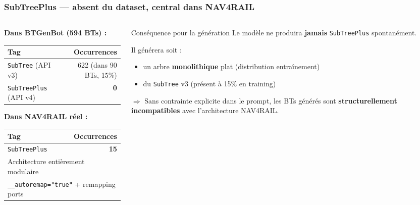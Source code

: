 \documentclass[aspectratio=169]{beamer}
\begin{document}
\begin{frame}
  \frametitle{SubTreePlus --- absent du dataset, central dans NAV4RAIL}

  \begin{columns}[T]
    \begin{column}{0.50\textwidth}
      \textbf{Dans BTGenBot (594 BTs) :}

      \vspace{0.4em}
      {\scriptsize\begin{tabular}{lr}
        \toprule
        Tag & Occurrences \\
        \midrule
        \texttt{SubTree} (API v3) & 622 (dans 90 BTs, 15\%) \\
        \texttt{SubTreePlus} (API v4) & \textbf{0} \\
        \bottomrule
      \end{tabular}}

      \vspace{0.6em}
      \textbf{Dans NAV4RAIL réel :}

      \vspace{0.4em}
      {\scriptsize\begin{tabular}{lr}
        \toprule
        Tag & Occurrences \\
        \midrule
        \texttt{SubTreePlus} & \textbf{15} \\
        \multicolumn{2}{l}{Architecture entièrement modulaire} \\
        \multicolumn{2}{l}{\texttt{\_\_autoremap="true"} + remapping ports} \\
        \bottomrule
      \end{tabular}}
    \end{column}
    \begin{column}{0.48\textwidth}
      \begin{alertblock}{Conséquence pour la génération}
        \small Le modèle ne produira \textbf{jamais} \texttt{SubTreePlus} spontanément.

        \vspace{0.3em}
        Il générera soit :
        \begin{itemize}
          \item un arbre \textbf{monolithique} plat (distribution entraînement)
          \item du \texttt{SubTree} v3 (présent à 15\% en training)
        \end{itemize}

        \vspace{0.3em}
        $\Rightarrow$ Sans contrainte explicite dans le prompt, les BTs générés sont \textbf{structurellement incompatibles} avec l'architecture NAV4RAIL.
      \end{alertblock}
    \end{column}
  \end{columns}
\end{frame}
\end{document}
